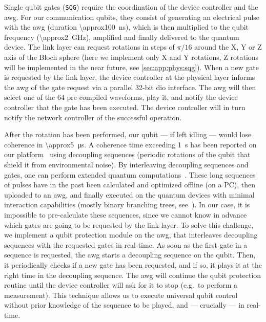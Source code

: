 Single qubit gates (\texttt{SQG}) require the coordination of the device controller and the
\acrshort{awg}. For our communication qubits, they consist of generating an electrical pulse with
the \acrshort{awg} (duration \qty{\approx100}{\ns}), which is then multiplied to the qubit frequency
(\qty{\approx2}{\GHz}), amplified and finally delivered to the quantum device. The link layer can
request rotations in steps of $\pi/16$ around the X, Y or Z axis of the Bloch sphere (here we
implement only X and Y rotations, Z rotations will be implemented in the near future, see
\cref{sec:app:phys:sqg}). When a new gate is requested by the link layer, the device controller at
the physical layer informs the \acrshort{awg} of the gate request via a parallel \num{32}-bit
\acrshort{dio} interface. The \acrshort{awg} will then select one of the $64$ pre-compiled
waveforms, play it, and notify the device controller that the gate has been executed. The device
controller will in turn notify the network controller of the successful operation.

After the rotation has been performed, our qubit --- if left idling --- would lose coherence in
\qty{\approx5}{\us}. A coherence time exceeding \qty{1}{s} has been reported on our
platform~\cite{abobeih_2018_one_sec} using decoupling sequences (periodic rotations of the qubit
that shield it from environmental noise). By interleaving decoupling sequences and gates, one can
perform extended quantum computations~\cite{bradley_2019_one_min}. These long sequences of pulses
have in the past been calculated and optimized offline (on a PC), then uploaded to an
\acrshort{awg}, and finally executed on the quantum devices with minimal interaction capabilities
(mostly binary branching trees, see~\cite{pompili_2021_multinode}). In our case, it is impossible to
pre-calculate these sequences, since we cannot know in advance which gates are going to be requested
by the link layer. To solve this challenge, we implement a {qubit protection} module on the
\acrshort{awg}, that interleaves decoupling sequences with the requested gates in real-time. As soon
as the first gate in a sequence is requested, the \acrshort{awg} starts a decoupling sequence on the
qubit. Then, it periodically checks if a new gate has been requested, and if so, it plays it at the
right time in the decoupling sequence. The \acrshort{awg} will continue the qubit protection routine
until the device controller will ask for it to stop (e.g.~to perform a measurement). This technique
allows us to execute universal qubit control without prior knowledge of the sequence to be played,
and --- crucially --- in real-time.

